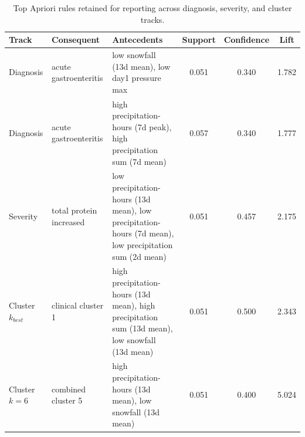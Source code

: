 \begin{table}[htbp]
\centering
\small
\begin{tabularx}{\textwidth}{>{\raggedright\arraybackslash}p{}>{\raggedright\arraybackslash}p{}>{\raggedright\arraybackslash}Xccc}
\toprule
Track & Consequent & Antecedents & Support & Confidence & Lift \\
\midrule
Diagnosis & acute gastroenteritis & low snowfall (13d mean), low day1 pressure max & 0.051 & 0.340 & 1.782 \\
Diagnosis & acute gastroenteritis & high precipitation-hours (7d peak), high precipitation sum (7d mean) & 0.057 & 0.340 & 1.777 \\
Severity & total protein increased & low precipitation-hours (13d mean), low precipitation-hours (7d mean), low precipitation sum (2d mean) & 0.051 & 0.457 & 2.175 \\
Cluster $k_{best}$ & clinical cluster 1 & high precipitation-hours (13d mean), high precipitation sum (13d mean), low snowfall (13d mean) & 0.051 & 0.500 & 2.343 \\
Cluster $k=6$ & combined cluster 5 & high precipitation-hours (13d mean), low snowfall (13d mean) & 0.051 & 0.400 & 5.024 \\
\bottomrule
\end{tabularx}
\caption{Top Apriori rules retained for reporting across diagnosis, severity, and cluster tracks.}
\label{tab:ch4_apriori_highlights}
\end{table}
